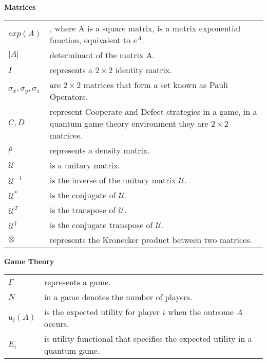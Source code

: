 \textbf{Matrices}

\renewcommand*{\arraystretch}{1.4}
\begin{longtable}[l]{p{50pt} p{300pt}}

$exp(A)$
&
, where A is a square matrix, is a matrix exponential function, equivalent to $e^{A}$.
\\
$\vert A \vert$
&
determinant of the matrix A.
\\
$I$ 
&
represents a $2 \times 2$ identity matrix.
\\
$\sigma_{x}, \sigma_{y}, \sigma_{z}$
&
 are $2 \times 2$ matrices that form a set known as Pauli Operators.
\\
$C, D$
&
 represent Cooperate and Defect strategies in a game, in a quantum game theory environment they are $2 \times 2$ matrices.
\\
$\rho$
&
 represents a density matrix.
\\
$\mathcal{U}$
&
 is a unitary matrix.
\\
$\mathcal{U}^{-1}$
& is the inverse of the unitary matrix $\mathcal{U}$.
\\
$\mathcal{U}^{*}$
&
 is the conjugate of $\mathcal{U}$.
\\
$\mathcal{U}^{T}$
&
 is the transpose of $\mathcal{U}$.
\\
$\mathcal{U}^{\dagger}$
&
 is the conjugate transpose of $\mathcal{U}$.
\\
$\otimes$ &
 represents the Kronecker product between two matrices.
\\
\end{longtable}

\textbf{Game Theory}
\begin{longtable}[l]{p{50pt} p{300pt}}

$\Gamma$ &
 represents a game.
\\
$N$
&
 in a game denotes the number of players.
\\
$u_{i}(A)$ &
 is the expected utility for player $i$ when the outcome $A$ occurs.
\\
$E_{i}$
& is utility functional that specifies the expected utility in a quantum game.
\\
\end{longtable}
\clearpage
\thispagestyle{empty}

\cleardoublepage

